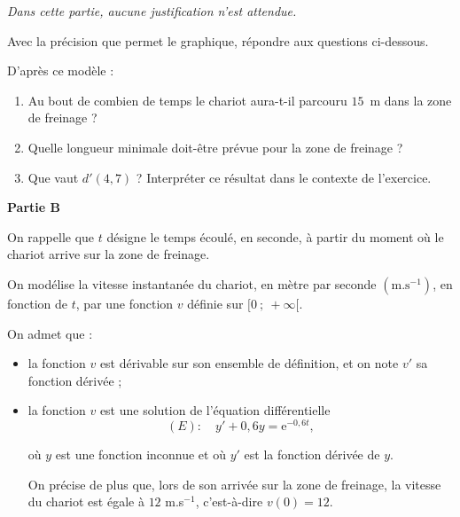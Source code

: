 \documentclass[10pt]{article}
\providecommand{\e}{{\mathrm{e}}}
\begin{document}
\emph{Dans cette partie, aucune justification n'est attendue.}

\medskip

Avec la précision que permet le graphique, répondre aux questions ci-dessous.

D'après ce modèle :

\medskip

\begin{enumerate}
\item Au bout de combien de temps le chariot aura-t-il parcouru $15$~m dans la zone de freinage ?
\item Quelle longueur minimale doit-être prévue pour la zone de freinage ?
\item Que vaut $d'(4,7)$ ? Interpréter ce résultat dans le contexte de l'exercice.
\end{enumerate}

\begin{center}\textbf{Partie B} \end{center}

On rappelle que $t$ désigne le temps écoulé, en seconde, à partir du moment où le chariot arrive sur la zone de freinage.

On modélise la vitesse instantanée du chariot, en mètre par seconde $\left(\text{m}.\text{s}^{-1}\right)$, en fonction de $t$, par une fonction $v$ définie sur $[0~;~+\infty[$.

On admet que :

\begin{itemize}[label=$\bullet~$]
\item la fonction $v$ est dérivable sur son ensemble de définition, et on note $v'$ sa
fonction dérivée ;
\item la fonction $v$ est une solution de l'équation différentielle 
\[(E) :\quad y' + 0,6y = \e^{-0,6t},\]

où $y$ est une fonction inconnue et où $y'$ est la fonction dérivée de $y$.

On précise de plus que, lors de son arrivée sur la zone de freinage, la vitesse du chariot est égale à $12$ m.s$^{-1}$, c'est-à-dire $v(0) = 12$.

\end{itemize}

\medskip
\end{document}

